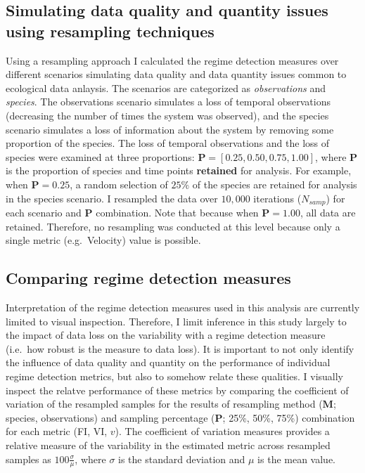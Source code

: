 \documentclass[12pt,twoside,openany]{reedthesis}
\begin{document}
\hypertarget{simulating-data-quality-and-quantity-issues-using-resampling-techniques}{%
\subsection{Simulating data quality and quantity issues using resampling techniques}\label{simulating-data-quality-and-quantity-issues-using-resampling-techniques}}

Using a resampling approach I calculated the regime detection measures over different scenarios simulating data quality and data quantity issues common to ecological data anlaysis. The scenarios are categorized as \emph{observations} and \emph{species}. The observations scenario simulates a loss of temporal observations (decreasing the number of times the system was observed), and the species scenario simulates a loss of information about the system by removing some proportion of the species. The loss of temporal observations and the loss of species were examined at three proportions: \(\textbf{P} = [0.25, 0.50, 0.75, 1.00]\), where \(\textbf{P}\) is the proportion of species and time points \textbf{retained} for analysis. For example, when \(\textbf{P} = 0.25\), a random selection of \(25\%\) of the species are retained for analysis in the species scenario. I resampled the data over \(10,000\) iterations (\(N_{samp}\)) for each scenario and \(\textbf{P}\) combination. Note that because when \(\textbf{P} = 1.00\), all data are retained. Therefore, no resampling was conducted at this level because only a single metric (e.g.~Velocity) value is possible.

\hypertarget{comparing-regime-detection-measures}{%
\subsection{Comparing regime detection measures}\label{comparing-regime-detection-measures}}

Interpretation of the regime detection measures used in this analysis are currently limited to visual inspection. Therefore, I limit inference in this study largely to the impact of data loss on the variability with a regime detection measure (i.e.~how robust is the measure to data loss). It is important to not only identify the influence of data quality and quantity on the performance of individual regime detection metrics, but also to somehow relate these qualities. I visually inspect the relatve performance of these metrics by comparing the coefficient of variation of the resampled samples for the results of resampling method (\(\textbf{M}\); species, observations) and sampling percentage (\(\textbf{P}\); 25\%, 50\%, 75\%) combination for each metric (FI, VI, \(v\)). The coefficient of variation measures provides a relative measure of the variability in the estimated metric across resampled samples as \(100\frac{\sigma}{\mu}\), where \(\sigma\) is the standard deviation and \(\mu\) is the mean value.
\end{document}
